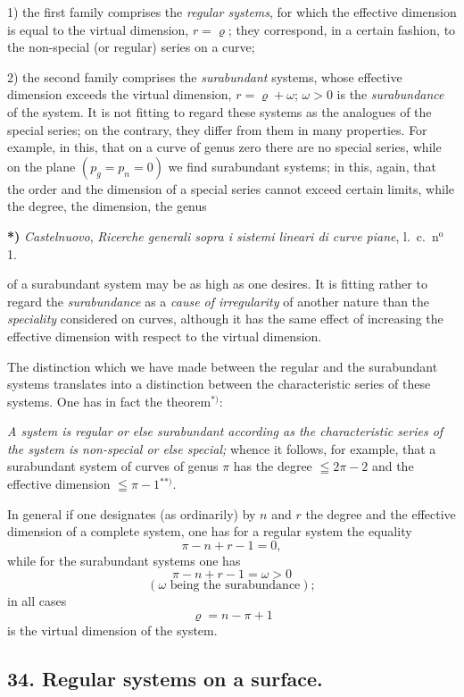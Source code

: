 \documentclass{article}
\begin{document}
1) the first family comprises the \emph{regular systems}, for which the effective dimension is equal to the virtual dimension, $r = \varrho$; they correspond, in a certain fashion, to the non-special (or regular) series on a curve;

2) the second family comprises the \emph{surabundant} systems, whose effective dimension exceeds the virtual dimension, $r = \varrho + \omega$; $\omega > 0$ is the \emph{surabundance} of the system. It is not fitting to regard these systems as the analogues of the special series; on the contrary, they differ from them in many properties. For example, in this, that on a curve of genus zero there are no special series, while on the plane $(p_{g} = p_{n} = 0)$ we find surabundant systems; in this, again, that the order and the dimension of a special series cannot exceed certain limits, while the degree, the dimension, the genus

\textbf{*)} \emph{Castelnuovo}, \emph{Ricerche generali sopra i sistemi lineari di curve piane}, l.\ c.\ n${}^{\text{o}}$ 1.

of a surabundant system may be as high as one desires. It is fitting rather to regard the \emph{surabundance} as a \emph{cause of irregularity} of another nature than the \emph{speciality} considered on curves, although it has the same effect of increasing the effective dimension with respect to the virtual dimension.

The distinction which we have made between the regular and the surabundant systems translates into a distinction between the characteristic series of these systems. One has in fact the theorem${}^{*)}$:

\emph{A system is regular or else surabundant according as the characteristic series of the system is non-special or else special;} whence it follows, for example, that a surabundant system of curves of genus $\pi$ has the degree $\leqq 2\pi - 2$ and the effective dimension $\leqq \pi - 1$${}^{**)}$.

In general if one designates (as ordinarily) by $n$ and $r$ the degree and the effective dimension of a complete system, one has for a regular system the equality
\[ \pi - n + r - 1 = 0, \tag{1} \]
while for the surabundant systems one has
\[ \pi - n + r - 1 = \omega > 0 \tag{2} \]
\[ (\omega \text{ being the surabundance}); \]
in all cases
\[ \varrho = n - \pi + 1 \tag{3} \]
is the virtual dimension of the system.

\subsection*{34. Regular systems on a surface.}
\end{document}
